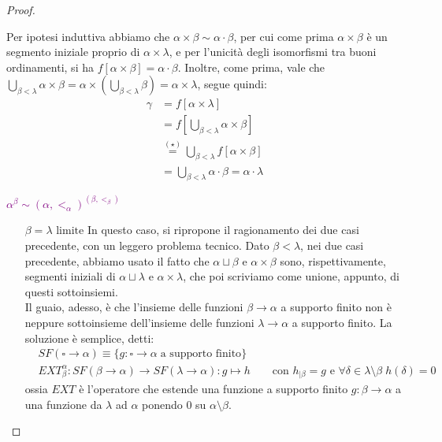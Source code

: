 \begin{proof}
\begin{itemize}
		Per ipotesi induttiva abbiamo che $\alpha \times \beta \sim \alpha \cdot \beta$, per cui come prima $\alpha \times \beta$ è un segmento iniziale proprio di $\alpha \times \lambda$, e per l'unicità degli isomorfismi tra buoni ordinamenti,
		si ha $f[\alpha \times \beta] = \alpha \cdot \beta$. Inoltre, come prima, vale che $\bigcup_{\beta < \lambda} \alpha \times \beta = \alpha \times \left(\bigcup_{\beta < \lambda} \beta\right) = \alpha \times \lambda$, segue quindi:
		\[ \begin{split}
			\gamma &= f[\alpha \times \lambda] \\
				   &= f\left[\bigcup_{\beta < \lambda} \alpha \times \beta\right] \\
				   &\overset{(\star)}{=} \bigcup_{\beta < \lambda} f[\alpha \times \beta] \\
				   &= \bigcup_{\beta < \lambda} \alpha \cdot \beta = \alpha \cdot \lambda
		\end{split}
			\]
	\end{itemize}
	\textcolor{purple}{$\alpha^\beta \sim (\alpha,<_\alpha)^{(\beta,<_\beta)}$}
	\begin{itemize}
		\item[$\boxed{\text{$\beta = \lambda$ limite}}$] In questo caso, si ripropone il ragionamento dei due casi precedente, con un leggero problema tecnico. Dato $\beta < \lambda$, nei due casi precedente, abbiamo usato il fatto che $\alpha \sqcup \beta$ e $\alpha \times \beta$ sono,
		rispettivamente, segmenti iniziali di $\alpha \sqcup \lambda$ e $\alpha \times \lambda$, che poi scriviamo come unione, appunto, di questi sottoinsiemi.\\
		Il guaio, adesso, è che l'insieme delle funzioni $\beta \rightarrow \alpha$ a supporto finito non è neppure sottoinsieme dell'insieme delle funzioni $\lambda \rightarrow \alpha$ a supporto finito. La soluzione è semplice, detti:
		\begin{align*}
			& SF(\square \rightarrow \alpha) \equiv \{g : \square \rightarrow \alpha \; \text{a supporto finito}\} \\
			& EXT_\beta^\alpha : SF(\beta \rightarrow \alpha) \rightarrow SF(\lambda \rightarrow \alpha) : g \mapsto h \qquad\text{con $h_{|\beta} = g$ e $\forall \delta \in \lambda\setminus\beta \; h(\delta) = 0$}
		\end{align*}
		ossia $EXT$ è l'operatore che estende una funzione a supporto finito $g : \beta \rightarrow \alpha$ a una funzione da $\lambda$ ad $\alpha$ ponendo 0 su $\alpha \setminus\beta$.\\

\end{itemize}
\end{proof}
